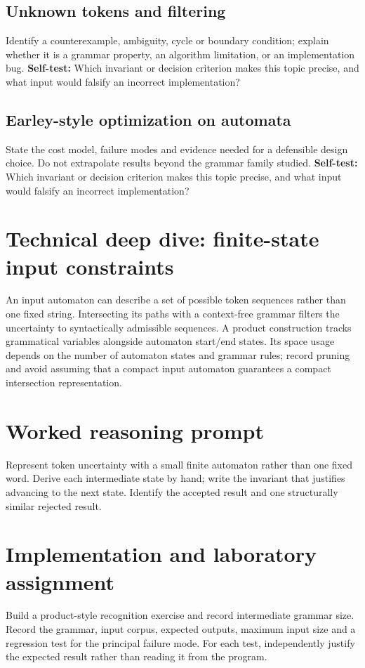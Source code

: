 \documentclass[11pt,letterpaper]{article}
\begin{document}
\subsection{Unknown tokens and filtering}
Identify a counterexample, ambiguity, cycle or boundary condition; explain whether it is a grammar property, an algorithm limitation, or an implementation bug.
\textbf{Self-test:} Which invariant or decision criterion makes this topic precise, and what input would falsify an incorrect implementation?
\subsection{Earley-style optimization on automata}
State the cost model, failure modes and evidence needed for a defensible design choice. Do not extrapolate results beyond the grammar family studied.
\textbf{Self-test:} Which invariant or decision criterion makes this topic precise, and what input would falsify an incorrect implementation?
\section{Technical deep dive: finite-state input constraints}
An input automaton can describe a set of possible token sequences rather than one fixed string. Intersecting its paths with a context-free grammar filters the uncertainty to syntactically admissible sequences. A product construction tracks grammatical variables alongside automaton start/end states. Its space usage depends on the number of automaton states and grammar rules; record pruning and avoid assuming that a compact input automaton guarantees a compact intersection representation.
\section{Worked reasoning prompt}
Represent token uncertainty with a small finite automaton rather than one fixed word. Derive each intermediate state by hand; write the invariant that justifies advancing to the next state. Identify the accepted result and one structurally similar rejected result.
\section{Implementation and laboratory assignment}
Build a product-style recognition exercise and record intermediate grammar size. Record the grammar, input corpus, expected outputs, maximum input size and a regression test for the principal failure mode. For each test, independently justify the expected result rather than reading it from the program.
\end{document}
